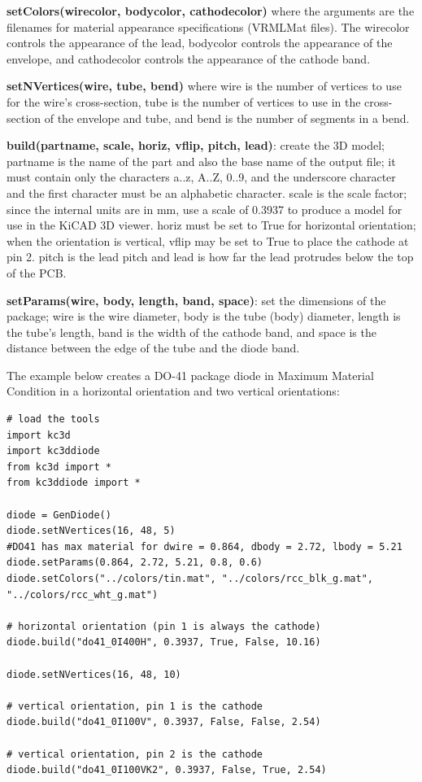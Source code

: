 \textbf{setColors(wirecolor, bodycolor, cathodecolor)}
where the arguments are the filenames for material appearance specifications
(VRMLMat files). The wirecolor controls the appearance of the lead,
bodycolor controls the appearance of the envelope, and
cathodecolor controls the appearance of the cathode band.

\textbf{setNVertices(wire, tube, bend)} where wire is the number of
vertices to use for the wire's cross-section, tube is the number of
vertices to use in the cross-section of the envelope and tube,
and bend is the number of segments in a bend.

\textbf{build(partname, scale, horiz, vflip, pitch, lead)}: create the
3D model; partname is the name of the part and also the base name of the
output file; it must contain only the characters a..z, A..Z, 0..9, and the 
underscore character and the first character must be an alphabetic character.
scale is the scale factor; since the internal units are in mm, use a scale of
0.3937 to produce a model for use in the KiCAD 3D viewer. horiz must be set to
True for horizontal orientation; when the orientation is vertical, vflip may
be set to True to place the cathode at pin 2. pitch is the lead pitch and
lead is how far the lead protrudes below the top of the PCB.

\textbf{setParams(wire, body, length, band, space)}: set the dimensions of the
package; wire is the wire diameter, body is the tube (body) diameter, length
is the tube's length, band is the width of the cathode band, and space is the
distance between the edge of the tube and the diode band.

The example below creates a DO-41 package diode in Maximum Material Condition
in a horizontal orientation and two vertical orientations:

\begin{verbatim}
# load the tools
import kc3d
import kc3ddiode
from kc3d import *
from kc3ddiode import *

diode = GenDiode()
diode.setNVertices(16, 48, 5)
#DO41 has max material for dwire = 0.864, dbody = 2.72, lbody = 5.21
diode.setParams(0.864, 2.72, 5.21, 0.8, 0.6)
diode.setColors("../colors/tin.mat", "../colors/rcc_blk_g.mat", "../colors/rcc_wht_g.mat")

# horizontal orientation (pin 1 is always the cathode)
diode.build("do41_0I400H", 0.3937, True, False, 10.16)

diode.setNVertices(16, 48, 10)

# vertical orientation, pin 1 is the cathode
diode.build("do41_0I100V", 0.3937, False, False, 2.54)

# vertical orientation, pin 2 is the cathode
diode.build("do41_0I100VK2", 0.3937, False, True, 2.54)
\end{verbatim}
